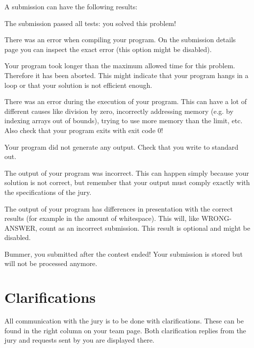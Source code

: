 A submission can have the following results:

\begin{description}[\setleftmargin{4.5cm}]
\item[CORRECT]
The submission passed all tests: you solved this problem!

\item[COMPILER-ERROR]
There was an error when compiling your program. On the submission
details page you can inspect the exact error (this option might be
disabled).

\item[TIMELIMIT]
Your program took longer than the maximum allowed time for this
problem. Therefore it has been aborted. This might indicate that your
program hangs in a loop or that your solution is not efficient
enough.

\item[RUN-ERROR]
There was an error during the execution of your program. This can have
a lot of different causes like division by zero, incorrectly
addressing memory (e.g. by indexing arrays out of bounds), trying to
use more memory than the limit, etc.
Also check that your program exits with exit code 0!

\item[NO-OUTPUT]
Your program did not generate any output. Check that you write to
standard out.

\item[WRONG-ANSWER]
The output of your program was incorrect. This can happen simply
because your solution is not correct, but remember that your output
must comply exactly with the specifications of the jury.

\item[PRESENTATION-ERROR]
The output of your program has differences in presentation with the
correct results (for example in the amount of whitespace). This will,
like WRONG-ANSWER, count as an incorrect submission. This result is
optional and might be disabled.

\item[TOO-LATE]
Bummer, you submitted after the contest ended! Your submission is
stored but will not be processed anymore.
\end{description}

\section{Clarifications}

All communication with the jury is to be done with clarifications.
These can be found in the right column on your team page. Both
clarification replies from the jury and requests sent by you
are displayed there.

